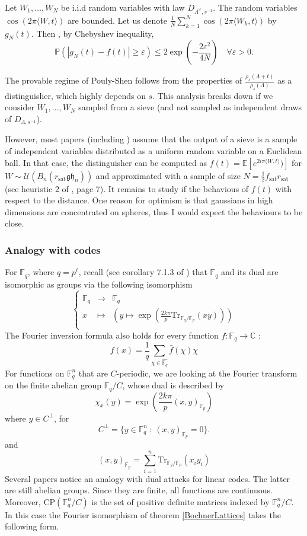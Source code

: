 \documentclass{article}
\begin{document}
Let $W_1,\ldots , W_N$ be i.i.d random variables with law $D_{\Lambda^\vee, s^{-1}}$. The random variables $\cos (2\pi \langle W , t \rangle ) $ are bounded. 
Let us denote $\frac{1}{N}\sum_{k=1}^N \cos (2\pi \langle W_k , t \rangle )$ by $g_N(t)$. Then , by Chebyshev inequality,
\[\mathbb P( |g_N(t) - f(t) |\geq \varepsilon ) \leq  2 \exp( - \frac{2\varepsilon^2}{4N}) \quad \forall \varepsilon >0.\]

The provable regime of Pouly-Shen follows from the properties of $\frac{ \rho_s (\Lambda + t)}{\rho_s (\Lambda )}$ as a distinguisher, which highly depends on $s$. This analysis breaks down if we consider $W_1,\ldots , W_N$ sampled from a sieve (and not sampled as independent draws of $D_{\Lambda,s^{-1}}$). 

However, most papers (including \cite{ducas2023accurate}) assume that the output of a sieve is a sample of independent variables distributed as a uniform random variable on a Euclidean ball. In that case, the distinguisher can be computed as $f(t) = \mathbb E[e^{2i\pi\langle W , t \rangle} )]$ for $W\sim \mathcal U(B_n(r_{\text{sat}} \mathfrak{gh}_n))$ and approximated with a sample of size $N = \frac{1}{2}f_{\text{sat}}r_{\text{sat}} $ (see heuristic 2 of \cite{ducas2023accurate}, page 7). It remains to study if the behavious of $f(t)$ with respect to the distance. One reason for optimism is that gaussians in high dimensions are concentrated on spheres, thus I would expect the behaviours to be close.    

\subsubsection{Analogy with codes}

For $\mathbb F_q$, where $q = p^\ell$, recall (see corollary 7.1.3 of \cite{scarabotti2018discrete}) that $\mathbb F_q$ and its dual are isomorphic as groups via the following isomorphism 
\[\left\{ \begin{array}{rcl}
\mathbb F_q 	& \rightarrow 	& \hat {\mathbb F_q} \\
x	& \mapsto 	& \left( y\mapsto \exp (\frac{2k\pi }{p}\text{Tr}_{\mathbb F_q / \mathbb F_p}(xy)) \right)\\
\end{array}\right.\]
The Fourier inversion formula also holds for every function $f : \mathbb F_q \rightarrow \mathbb C$ :
\[f(x) = \frac{1}{q} \sum_{\chi \in \hat{\mathbb F_q}} \hat f(\chi) \chi \]
For functions on $\mathbb F_q^n$ that are $C$-periodic, we are looking at the Fourier transform on the finite abelian group $\mathbb F_q / C$, whose dual is described by
\[ \chi_x(y) = \exp (\frac{2k\pi }{p}(x,y)_{\mathbb F_p} )\]
where $y \in C^\perp$, for 
\[C^{\perp} = \{y\in \mathbb F_q^n \ : \ (x,y)_{\mathbb F_p}= 0   \}.\]
and 
\[(x,y)_{\mathbb F_p} = \sum_{i=1}^n \text{Tr}_{\mathbb F_q / \mathbb F_p}(x_iy_i) \]
Several papers notice an analogy with dual attacks for linear codes. The latter are still abelian groups. Since they are finite, all functions are continuous. Moreover, $\text{CP}(\mathbb F_q^n / C)$ is the set of positive definite matrices indexed by $\mathbb F_q^n / C$. In this case the Fourier isomorphism of theorem \ref{BochnerLattices} takes the following form.
\end{document}
